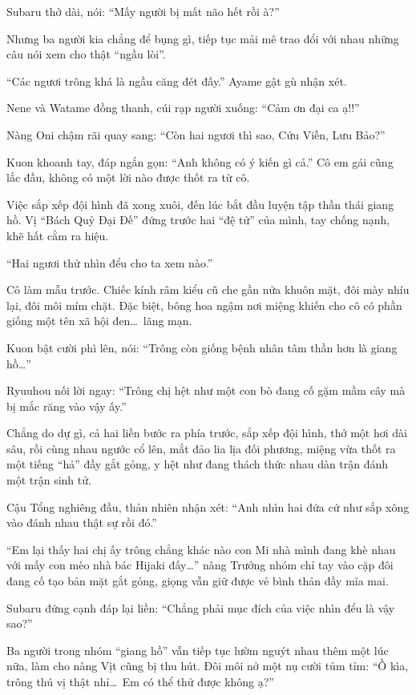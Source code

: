 \documentclass[../main.tex]{subfiles}
\begin{document}
Subaru thở dài, nói: ``Mấy người bị mất não hết rồi à?''

Nhưng ba người kia chẳng để bụng gì, tiếp tục mải mê trao đổi với nhau những câu nói xem cho thật ``ngầu lòi''.

``Các ngươi trông khá là ngầu căng đét đấy.'' Ayame gật gù nhận xét.

Nene và Watame đồng thanh, cúi rạp người xuống: ``Cảm ơn đại ca ạ!!''

Nàng Oni chậm rãi quay sang: ``Còn hai ngươi thì sao, Cửu Viễn, Lưu Bảo?''

Kuon khoanh tay, đáp ngắn gọn: ``Anh không có ý kiến gì cả.'' Cô em gái cũng lắc đầu, không có một lời nào được thốt ra từ cô.

\ct

Việc sắp xếp đội hình đã xong xuôi, đến lúc bắt đầu luyện tập thần thái giang hồ. Vị ``Bách Quỷ Đại Đế'' đứng trước hai ``đệ tử'' của mình, tay chống nạnh, khẽ hất cằm ra hiệu.

``Hai ngươi thử nhìn đểu cho ta xem nào.''

Cô làm mẫu trước. Chiếc kính râm kiểu cũ che gần nửa khuôn mặt, đôi mày nhíu lại, đôi môi mím chặt. Đặc biệt, bông hoa ngậm nơi miệng khiến cho cô có phần giống một tên xã hội đen\dots\ lãng mạn.


Kuon bật cười phì lên, nói: ``Trông còn giống bệnh nhân tâm thần hơn là giang hồ\dots''

Ryuuhou nối lời ngay: ``Trông chị hệt như một con bò đang cố gặm mầm cây mà bị mắc răng vào vậy ấy.''

Chẳng do dự gì, cả hai liền bước ra phía trước, sắp xếp đội hình, thở một hơi dài sâu, rồi cùng nhau ngước cổ lên, mắt đảo lia lịa đối phương, miệng vừa thốt ra một tiếng ``hả'' đầy gắt gỏng, y hệt như đang thách thức nhau dàn trận đánh một trận sinh tử.

Cậu Tổng nghiêng đầu, thản nhiên nhận xét: ``Anh nhìn hai đứa cứ như sắp xông vào đánh nhau thật sự rồi đó.''

``Em lại thấy hai chị ấy trông chẳng khác nào con Mi nhà mình đang khè nhau với mấy con mèo nhà bác Hijaki đấy\dots'' nàng Trưởng nhóm chỉ tay vào cặp đôi đang cố tạo bản mặt gắt gỏng, giọng vẫn giữ được vẻ bình thản đầy mỉa mai.

Subaru đứng cạnh đáp lại liền: ``Chẳng phải mục đích của việc nhìn đểu là vậy sao?''

Ba người trong nhóm ``giang hồ'' vẫn tiếp tục lườm nguýt nhau thêm một lúc nữa, làm cho nàng Vịt cũng bị thu hút. Đôi môi nở một nụ cười tủm tỉm: ``Ồ kìa, trông thú vị thật nhỉ\dots\ Em có thể thử được không ạ?''
\end{document}
